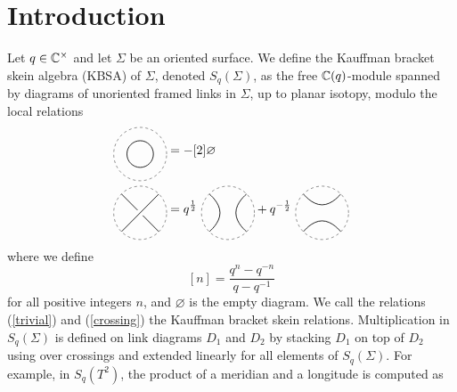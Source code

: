 \section{Introduction}

Let $q \in \mathbb{C}^\times$ and let $\Sigma$ be an oriented surface.
We define the Kauffman bracket skein algebra (KBSA) of $\Sigma$, denoted $S_q(\Sigma)$,
as the free $\mathbb{C}(q)$-module spanned by diagrams of unoriented framed links
in $\Sigma$, up to planar isotopy, modulo the local relations
\begin{align}
    \scalebox{0.75}{\trivialcomponent} & = -[2]\varnothing \label{trivial} \\
    \scalebox{0.75}{\positivecrossing} & = q^{\frac12} \ \scalebox{0.75}{\verticalresolution} + q^{-\frac12} \ \scalebox{0.75}{\horizontalresolution} \label{crossing}
\end{align}
where we define $$[n] = \frac{q^n - q^{-n}}{q - q^{-1}}$$
for all positive integers $n$, and $\varnothing$ is the empty
diagram. We call the relations (\ref{trivial}) and (\ref{crossing})
the Kauffman bracket skein relations. Multiplication in $S_q(\Sigma)$
is defined on link diagrams $D_1$ and $D_2$ by stacking $D_1$
on top of $D_2$ using over crossings and extended linearly for all
elements of $S_q(\Sigma)$. For example, in $S_q(T^2)$,
the product of a meridian and a longitude is computed as
